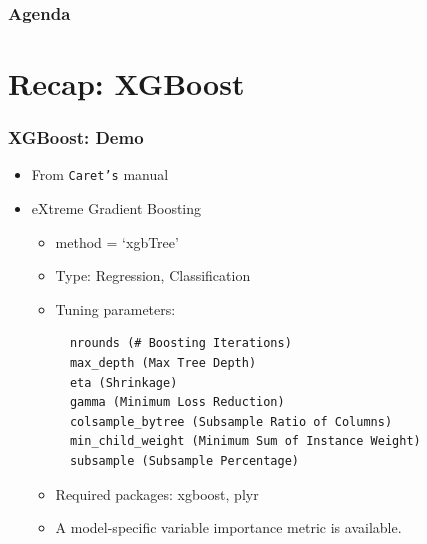 \documentclass[
  shownotes,
  xcolor={svgnames},
  hyperref={colorlinks,citecolor=DarkBlue,linkcolor=DarkRed,urlcolor=DarkBlue}
  , aspectratio=169]{beamer}
\begin{document}

\begin{frame}
\frametitle{Agenda}

\tableofcontents

\end{frame}
\section{Recap: XGBoost}

\begin{frame}[fragile]
\frametitle{XGBoost: Demo}
\begin{itemize}
\item From \texttt{Caret's} manual

\item eXtreme Gradient Boosting
\medskip
\begin{itemize}
\item method = `xgbTree'
\medskip
\item Type: Regression, Classification
\medskip
\item Tuning parameters:

  
  \begin{verbatim}
  nrounds (# Boosting Iterations)
  max_depth (Max Tree Depth)
  eta (Shrinkage)
  gamma (Minimum Loss Reduction)
  colsample_bytree (Subsample Ratio of Columns)
  min_child_weight (Minimum Sum of Instance Weight)
  subsample (Subsample Percentage)
  \end{verbatim}



  \item Required packages: xgboost, plyr
  \medskip
  \item A model-specific variable importance metric is available.
\end{itemize}
\end{itemize}

\end{frame}
\end{document}

